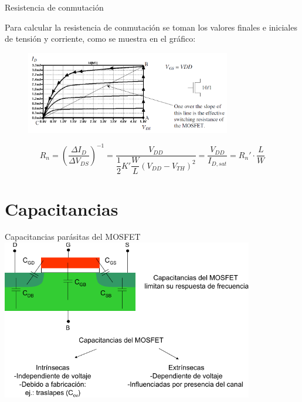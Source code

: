 \documentclass[t,aspectratio=169]{beamer}
\begin{document}
\begin{frame}{Resistencia de conmutación}

Para calcular la resistencia de conmutación se toman los valores finales e iniciales de tensión y corriente, como se muestra en el gráfico:
%
\begin{figure}
    \centering
    \includegraphics[width=0.8\textwidth]{figuras/mosfet_curva_salida_digital.png}
\end{figure}
%
\[ R_n = \left( \dfrac{\Delta I_D}{\Delta V_{DS}} \right)^{-1} = \dfrac{V_{DD}}{\dfrac{1}{2} K' \dfrac{W}{L} (V_{DD}-V_{TH})^2} = \dfrac{V_{DD}}{I_{D,sat}} =  R_n' \cdot \dfrac{L}{W} \]

\end{frame}


\section{Capacitancias}
\begin{frame}{Capacitancias parásitas del MOSFET}
\centering
\includegraphics[width=11cm]{./figuras/MOScap.pdf}
\end{frame}
\end{document}
